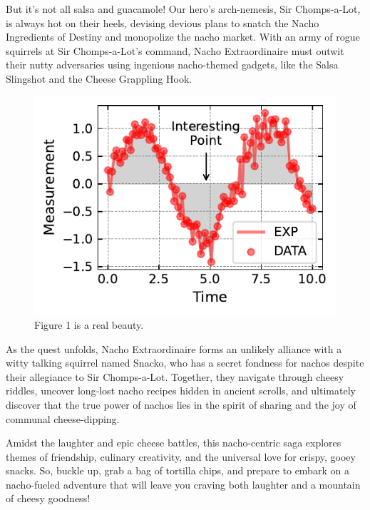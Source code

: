 But it's not all salsa and guacamole! Our hero's arch-nemesis, Sir Chomps-a-Lot, is always hot on their heels, devising devious plans to snatch the Nacho Ingredients of Destiny and monopolize the nacho market. With an army of rogue squirrels at Sir Chomps-a-Lot's command, Nacho Extraordinaire must outwit their nutty adversaries using ingenious nacho-themed gadgets, like the Salsa Slingshot and the Cheese Grappling Hook.

\begin{figure}[ht]
	\centering
	\includegraphics[scale=1]{../Figures/figure2.pdf}%
	\caption{Figure 1 is a real beauty.}
	\label{fig:figure1}	
\end{figure}

As the quest unfolds, Nacho Extraordinaire forms an unlikely alliance with a witty talking squirrel named Snacko, who has a secret fondness for nachos despite their allegiance to Sir Chomps-a-Lot. Together, they navigate through cheesy riddles, uncover long-lost nacho recipes hidden in ancient scrolls, and ultimately discover that the true power of nachos lies in the spirit of sharing and the joy of communal cheese-dipping.

Amidst the laughter and epic cheese battles, this nacho-centric saga explores themes of friendship, culinary creativity, and the universal love for crispy, gooey snacks. So, buckle up, grab a bag of tortilla chips, and prepare to embark on a nacho-fueled adventure that will leave you craving both laughter and a mountain of cheesy goodness!